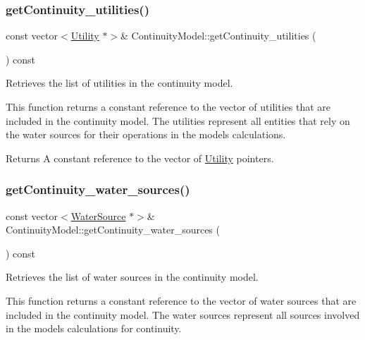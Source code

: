 \subsubsection{\texorpdfstring{get\+Continuity\+\_\+utilities()}{getContinuity\_utilities()}}
{\footnotesize\ttfamily const vector$<$\mbox{\hyperlink{classUtility}{Utility}} $\ast$$>$\& Continuity\+Model\+::get\+Continuity\+\_\+utilities (\begin{DoxyParamCaption}{ }\end{DoxyParamCaption}) const}



Retrieves the list of utilities in the continuity model. 

This function returns a constant reference to the vector of utilities that are included in the continuity model. The utilities represent all entities that rely on the water sources for their operations in the model\textquotesingle{}s calculations.

\begin{DoxyReturn}{Returns}
A constant reference to the vector of {\ttfamily \mbox{\hyperlink{classUtility}{Utility}}} pointers. 
\end{DoxyReturn}
\mbox{\label{classContinuityModel_aa0fbc434152c2ca4fc5e9534fa428de7}} 
\subsubsection{\texorpdfstring{get\+Continuity\+\_\+water\+\_\+sources()}{getContinuity\_water\_sources()}}
{\footnotesize\ttfamily const vector$<$\mbox{\hyperlink{classWaterSource}{Water\+Source}} $\ast$$>$\& Continuity\+Model\+::get\+Continuity\+\_\+water\+\_\+sources (\begin{DoxyParamCaption}{ }\end{DoxyParamCaption}) const}



Retrieves the list of water sources in the continuity model. 

This function returns a constant reference to the vector of water sources that are included in the continuity model. The water sources represent all sources involved in the model\textquotesingle{}s calculations for continuity.

